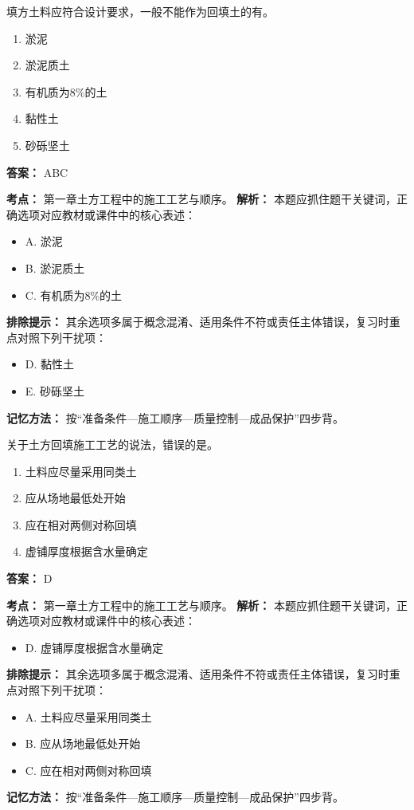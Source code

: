 \documentclass[UTF8,fontset=fandol,11pt]{ctexart}
\begin{document}
\begin{quizbox}[title={第 17 题}]
填方土料应符合设计要求，一般不能作为回填土的有。\\
\begin{enumerate}[label=\Alph*.]
\item 淤泥
\item 淤泥质土
\item 有机质为8\%的土
\item 黏性土
\item 砂砾坚土
\end{enumerate}
\textbf{答案：} ABC
\vspace{0.25em}
\begin{answerbox}[title={考点解析}]
\textbf{考点：} 第一章土方工程中的施工工艺与顺序。
\textbf{解析：} 本题应抓住题干关键词，正确选项对应教材或课件中的核心表述：
\begin{itemize}
\item A. 淤泥
\item B. 淤泥质土
\item C. 有机质为8\%的土
\end{itemize}
\textbf{排除提示：} 其余选项多属于概念混淆、适用条件不符或责任主体错误，复习时重点对照下列干扰项：
\begin{itemize}
\item D. 黏性土
\item E. 砂砾坚土
\end{itemize}
\textbf{记忆方法：} 按“准备条件—施工顺序—质量控制—成品保护”四步背。
\end{answerbox}
\end{quizbox}

\begin{quizbox}[title={第 18 题}]
关于土方回填施工工艺的说法，错误的是。\\
\begin{enumerate}[label=\Alph*.]
\item 土料应尽量采用同类土
\item 应从场地最低处开始
\item 应在相对两侧对称回填
\item 虚铺厚度根据含水量确定
\end{enumerate}
\textbf{答案：} D
\vspace{0.25em}
\begin{answerbox}[title={考点解析}]
\textbf{考点：} 第一章土方工程中的施工工艺与顺序。
\textbf{解析：} 本题应抓住题干关键词，正确选项对应教材或课件中的核心表述：
\begin{itemize}
\item D. 虚铺厚度根据含水量确定
\end{itemize}
\textbf{排除提示：} 其余选项多属于概念混淆、适用条件不符或责任主体错误，复习时重点对照下列干扰项：
\begin{itemize}
\item A. 土料应尽量采用同类土
\item B. 应从场地最低处开始
\item C. 应在相对两侧对称回填
\end{itemize}
\textbf{记忆方法：} 按“准备条件—施工顺序—质量控制—成品保护”四步背。
\end{answerbox}
\end{quizbox}
\end{document}
